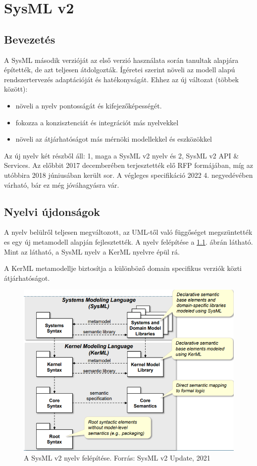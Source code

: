 \chapter{SysML v2}
\section{Bevezetés}
A SysML második verzióját az első verzió használata során tanultak alapjára építették, de azt teljesen átdolgozták.
Ígéretei szerint növeli az modell alapú rendszertervezés adaptációját és hatékonyságát.
Ehhez az új változat (többek között):
\begin{itemize}
    \item növeli a nyelv pontosságát és kifejezőképességét.
    \item fokozza a konzisztenciát és integrációt más nyelvekkel
    \item növeli az átjárhatóságot más mérnöki modellekkel és eszközökkel
\end{itemize}

Az új nyelv két részből áll: 1, maga a SysML v2 nyelv és 2, SysML v2 API \& Services.
Az előbbit 2017 decemberében terjesztették elő RFP formájában, míg az utóbbira 2018 júniusában került sor.
A végleges specifikáció 2022 4. negyedévében várható, bár ez még jóváhagyásra vár.

\section{Nyelvi újdonságok}
A nyelv belülről teljesen megváltozott, az UML-től való függőséget megszüntették es egy új metamodell alapján fejlesztették.
A nyelv felépítése a \ref{fig:v2meta}. ábrán látható. Mint az látható, a SysML nyelv a KerML nyelvre épül rá.

A KerML metamodellje biztosítja a különböző domain specifikus verziók közti átjárhatóságot.

\begin{figure}
    \centering
    \includegraphics[width=150mm, keepaspectratio]{figures/v2_metamodel.png}
    \caption{A SysML v2 nyelv felépítése. Forrás: SysML v2 Update, 2021}
    \label{fig:v2meta}
\end{figure}

